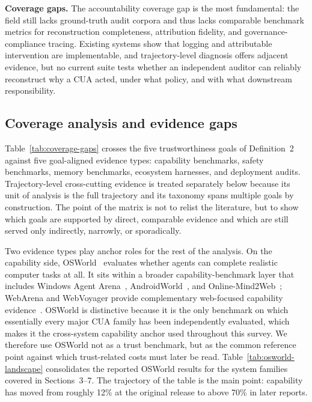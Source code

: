 \textbf{Coverage gaps.} The accountability coverage gap is the most fundamental: the field still lacks ground-truth audit corpora and thus lacks comparable benchmark metrics for reconstruction completeness, attribution fidelity, and governance-compliance tracing. Existing systems show that logging and attributable intervention are implementable, and trajectory-level diagnosis offers adjacent evidence, but no current suite tests whether an independent auditor can reliably reconstruct why a CUA acted, under what policy, and with what downstream responsibility.

\subsection{Coverage analysis and evidence gaps}
\label{sec:evidence-types}

Table~\ref{tab:coverage-gaps} crosses the five trustworthiness goals of Definition~2 against five goal-aligned evidence types: capability benchmarks, safety benchmarks, memory benchmarks, ecosystem harnesses, and deployment audits. Trajectory-level cross-cutting evidence is treated separately below because its unit of analysis is the full trajectory and its taxonomy spans multiple goals by construction. The point of the matrix is not to relist the literature, but to show which goals are supported by direct, comparable evidence and which are still served only indirectly, narrowly, or sporadically.

Two evidence types play anchor roles for the rest of the analysis. On the capability side, OSWorld~\cite{osworld2024} evaluates whether agents can complete realistic computer tasks at all. It sits within a broader capability-benchmark layer that includes Windows Agent Arena~\cite{windowsarena2024}, AndroidWorld~\cite{androidworld2024}, and Online-Mind2Web~\cite{onlinemind2web2025}; WebArena and WebVoyager provide complementary web-focused capability evidence~\cite{webarena2023,webvoyager2024}. OSWorld is distinctive because it is the only benchmark on which essentially every major CUA family has been independently evaluated, which makes it the cross-system capability anchor used throughout this survey. We therefore use OSWorld not as a trust benchmark, but as the common reference point against which trust-related costs must later be read. Table~\ref{tab:osworld-landscape} consolidates the reported OSWorld results for the system families covered in Sections~3--7. The trajectory of the table is the main point: capability has moved from roughly 12\% at the original release to above 70\% in later reports.

